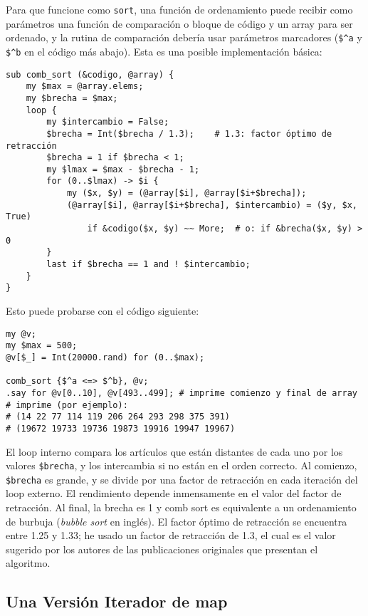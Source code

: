 Para que funcione como {\tt sort}, una función de ordenamiento
puede recibir como parámetros una función de comparación 
o bloque de código y un array para ser ordenado, y la rutina
de comparación debería usar parámetros marcadores (\verb|$^a| 
y  \verb|$^b| en el código más abajo). Esta es una posible implementación
básica:

\begin{verbatim}
sub comb_sort (&codigo, @array) {
    my $max = @array.elems;
    my $brecha = $max;
    loop {
        my $intercambio = False;
        $brecha = Int($brecha / 1.3);    # 1.3: factor óptimo de retracción
        $brecha = 1 if $brecha < 1;
        my $lmax = $max - $brecha - 1;
        for (0..$lmax) -> $i {
            my ($x, $y) = (@array[$i], @array[$i+$brecha]);
            (@array[$i], @array[$i+$brecha], $intercambio) = ($y, $x, True)
                if &codigo($x, $y) ~~ More;  # o: if &brecha($x, $y) > 0
        }
        last if $brecha == 1 and ! $intercambio;
    }
}
\end{verbatim}

Esto puede probarse con el código siguiente:

\begin{verbatim}
my @v;
my $max = 500;
@v[$_] = Int(20000.rand) for (0..$max);

comb_sort {$^a <=> $^b}, @v;
.say for @v[0..10], @v[493..499]; # imprime comienzo y final de array
# imprime (por ejemplo):
# (14 22 77 114 119 206 264 293 298 375 391)
# (19672 19733 19736 19873 19916 19947 19967)
\end{verbatim}

El loop interno compara los artículos que están distantes de cada uno
por los valores \verb|$brecha|, y los intercambia si no están en el orden
correcto. Al comienzo, \verb|$brecha| es grande, y se divide por una factor de
retracción en cada iteración del loop externo. El rendimiento depende
inmensamente en el valor del factor de retracción. Al final, la brecha
es 1 y comb sort es equivalente a un ordenamiento de burbuja (\emph{bubble sort} en inglés).
El factor óptimo de retracción se encuentra entre 1.25 y 1.33; 
he usado un factor de retracción de 1.3, el cual es el valor sugerido por 
los autores de las publicaciones originales que presentan el algoritmo. 

\subsection{Una Versión Iterador de map}

